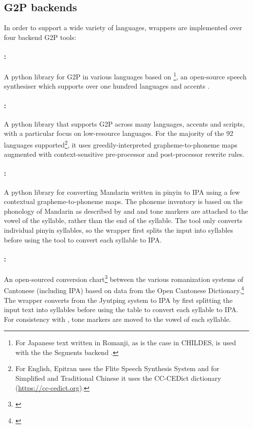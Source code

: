 \subsection{G2P backends}\label{sec:13-backends}

In order to support a wide variety of languages, wrappers are implemented over four backend G2P tools:

\paragraph{\phonemizer \citep{Bernard2021}:} A python library for G2P in various languages based on \footnote{For Japanese text written in Romanji, as is the case in CHILDES, \phonemizer is used with the the Segments backend \citep{robert_forkel_2019_3549784}.}, an open-source speech synthesiser which supports over one hundred languages and accents \citep{Dunn2019}.

\paragraph{\epitran \citep{Mortensen-et-al:2018}:} A python library that supports G2P across many languages, accents and scripts, with a particular focus on low-resource languages. For the majority of the 92 languages supported\footnote{For English, Epitran uses the Flite Speech Synthesis System \citep{black2001flite} and for Simplified and Traditional Chinese it uses the CC-CEDict dictionary (\url{https://cc-cedict.org}).}, it uses greedily-interpreted grapheme-to-phoneme maps augmented with context-sensitive pre-processor and post-processor rewrite rules.

\paragraph{\pinyin \citep{taubert_2024_pinyin-to-ipa_2024}:} A python library for converting Mandarin written in pinyin to IPA using a few contextual grapheme-to-phoneme maps. The phoneme inventory is based on the phonology of Mandarin as described by \cite{lin2007sounds} and \cite{duanmu2007phonology} and tone markers are attached to the vowel of the syllable, rather than the end of the syllable. The tool only converts individual pinyin syllables, so the wrapper first splits the input into syllables before using the tool to convert each syllable to IPA.

\paragraph{\pingyam :} An open-sourced conversion chart\footnote{\href{https://github.com/kfcd/pingyam}{}} between the various romanization systems of Cantonese (including IPA) based on data from the Open Cantonese Dictionary.\footnote{\href{https://www.kaifangcidian.com/han/yue/}{}} The wrapper converts from the Jyutping system to IPA by first splitting the input text into syllables before using the table to convert each syllable to IPA. For consistency with \pinyin, tone markers are moved to the vowel of each syllable. 

